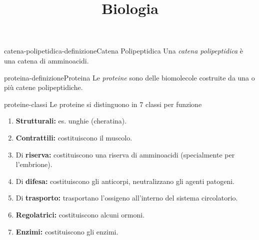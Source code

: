 \documentclass[preview]{standalone}
\begin{document}
\title{Biologia}
\genpage




\begin{snippetdefinition}{catena-polipetidica-definizione}{Catena Polipeptidica}
    Una \textit{catena polipeptidica} è una catena di amminoacidi.
\end{snippetdefinition}

\begin{snippetdefinition}{proteina-definizione}{Proteina}
    Le \textit{proteine} sono delle biomolecole costruite
    da una o più catene polipeptidiche.
\end{snippetdefinition}

\begin{snippet}{proteine-classi}
    Le proteine si distinguono in 7 classi per funzione
    \begin{enumerate}
        \item \textbf{Strutturali:} es. unghie (cheratina).

        \item \textbf{Contrattili:} costituiscono il muscolo.

        \item Di \textbf{riserva:} costituiscono una riserva di amminoacidi (specialmente per l'embrione).

        \item Di \textbf{difesa:} costituiscono gli anticorpi, neutralizzano gli agenti patogeni.
        
        \item Di \textbf{trasporto:} trasportano l'ossigeno all'interno del sistema circolatorio.

        \item \textbf{Regolatrici:} costituiscono alcuni ormoni.

        \item \textbf{Enzimi:} costituiscono gli enzimi.
    \end{enumerate}
\end{snippet}
\end{document}
